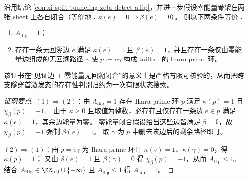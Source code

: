 \begin{conclusion}[\texorpdfstring{$A_{\mathrm{flip}}=1$}{A_flip=1} 的可审计充要证书：一条见证边与零能量闭合]\label{con:xi-split-tunneling-aflip1-auditable-certificate}
沿用结论 \ref{con:xi-split-tunneling-zeta-detect-aflip}，并进一步假设零能量骨架在两张 sheet 上各自闭合（等价地：\(\kappa(e)=0\Rightarrow \beta(e)=0\)）。
则以下两条件等价：
\begin{enumerate}
  \item \(A_{\mathrm{flip}}=1\)；
  \item 存在一条无回溯边 \(e\) 满足 \(\kappa(e)=1\) 且 \(\beta(e)=1\)，并且存在一条仅由零能量边组成的无回溯路径 \(\gamma\) 使 \(p:=e\gamma\) 构成 tailless 的 Ihara prime 环。
\end{enumerate}
该证书在“见证边 \(+\) 零能量无回溯闭合”的意义上是严格有限可核验的，从而把跨支隧穿首激发态的存在性判别归约为一次有限状态搜索。
\end{conclusion}
\begin{proof}[证明要点]
\((1)\Rightarrow(2)\)：由 \(A_{\mathrm{flip}}=1\) 存在 Ihara prime 环 \(p\) 满足 \(\kappa(p)=1\) 且 \(\chi_\beta(p)=-1\)。
由于 \(\kappa\ge 0\) 且取值为整数，必存在且仅存在一条边 \(e\in p\) 满足 \(\kappa(e)=1\)，其余边能量为零。
零能量闭合假设给出这些边皆满足 \(\beta=0\)，故 \(\chi_\beta(p)=-1\) 强制 \(\beta(e)=1\)。
取 \(\gamma\) 为 \(p\) 中删去该边后的剩余路径即可。
\par
\((2)\Rightarrow(1)\)：由 \(p=e\gamma\) 为 Ihara prime 环且 \(\kappa(e)=1\)、\(\kappa(\gamma)=0\)，得 \(\kappa(p)=1\)；
又由 \(\beta(e)=1\) 且 \(\beta(\gamma)=0\) 得 \(\chi_\beta(p)=-1\)，从而 \(A_{\mathrm{flip}}\le 1\)。
结合 \(A_{\mathrm{flip}}\in\ZZ_{>0}\cup\{+\infty\}\) 且 \(A_{\mathrm{flip}}\le 1\) 得 \(A_{\mathrm{flip}}=1\)。
\end{proof}


